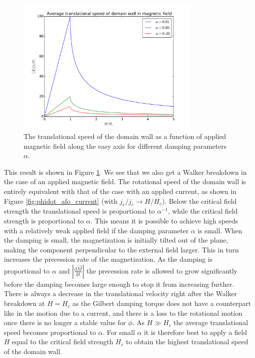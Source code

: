 \documentclass[12pt, a4paper]{article}		%
\numberwithin{equation}{section}
\begin{document}
\begin{figure}[h!]
\begin{center}
\includegraphics[width=0.8\textwidth]{Figures/criticalField.pdf} 
\caption{The translational speed of the domain wall as a function of applied magnetic field along the easy axis for different damping parameters $\alpha$.}
\label{fig:criticalField} 
\end{center}
\end{figure}
This result is shown in Figure \ref{fig:criticalField}. We see that we also get a Walker breakdown in the case of an applied magnetic field. The rotational speed of the domain wall is entirely equivalent with that of the case with an applied current, as shown in Figure \ref{fig:phidot_afo_current} (with $j_e/j_c \rightarrow H/H_c$). Below the critical field strength the translational speed is proportional to $\alpha^{-1}$, while the critical field strength is proportional to $\alpha$. This means it is possible to achieve high speeds with a relatively weak applied field if the damping parameter $\alpha$ is small. When the damping is small, the magnetization is initially tilted out of the plane, making the component perpendicular to the external field larger. This in turn increases the precession rate of the magnetization. As the damping is proportional to $\alpha$ and $|\frac{\textrm{d} \vec{M}}{\textrm{d} t}|$ the precession rate is allowed to grow significantly before the damping becomes large enough to stop it from increasing further. There is always a decrease in the translational velocity right after the Walker breakdown at $H=H_c$ as the Gilbert damping torque does not have a counterpart like in the motion due to a current, and there is a loss to the rotational motion once there is no longer a stable value for $\phi$. As $H\gg H_c$ the average translational speed becomes proportional to $\alpha$. For small $\alpha$ it is therefore best to apply a field $H$ equal to the critical field strength $H_c$ to obtain the highest translational speed of the domain wall.
\end{document}
